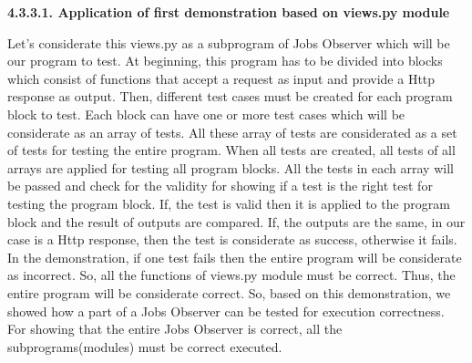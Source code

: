 \documentclass[conference,compsoc]{IEEEtran}
\begin{document}
\noindent
\newline
\textbf{4.3.3.1. Application of first demonstration based on views.py module}

Let's considerate this views.py as a subprogram of Jobs Observer which will be our program to test. At beginning, this program has to be divided into blocks which consist of functions that accept a request as input and provide a Http response as output. 
\newline                                                                                                                                                   
Then, different test cases must be created for each program block to test. Each block can have one or more test cases which will be considerate as an array of tests. All these array of tests are considerated as a set of tests for testing the entire program.  
\newline                                                                                                                                     
When all tests are created, all tests of all arrays are applied for testing all program blocks. All the tests in each array will be passed and check for the validity for showing if a test is the right test for testing the program block. If, the test is valid then it is applied to the program block and the result of outputs are compared. If, the outputs are the same, in our case is a Http response, then the test is considerate as success, otherwise it fails. \newline
In the demonstration, if one test fails then the entire program will be considerate as incorrect. So, all the functions of views.py module must be correct. Thus, the entire program will be considerate correct. So, based on this demonstration, we showed how a part of a Jobs Observer can be tested for execution correctness.
\newline
For showing that the entire Jobs Observer is correct, all the subprograms(modules) must be correct executed. 
\end{document}
